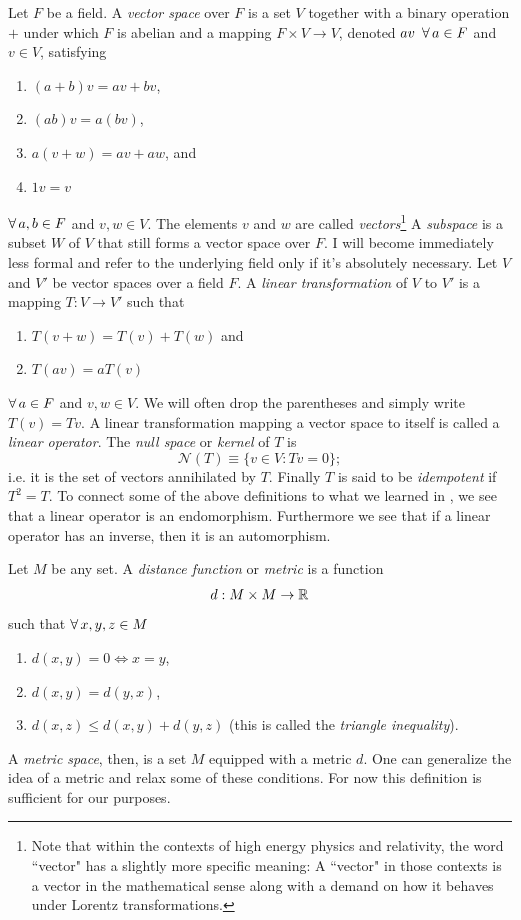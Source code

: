   Let $F$ be a field. A {\it vector space} over $F$ is a set
  $V$ together with a binary operation $+$ under which $F$ is abelian and a
  mapping $F\times V\to V$, denoted $av\ \operatorname{\forall} a\in F$ and $v\in V$,
  satisfying
  \begin{enumerate}
    \item $(a+b)v=av+bv$,
    \item $(ab)v=a(bv)$,
    \item $a(v+w)=av+aw$, and
    \item $1v=v$
  \end{enumerate}
  $\operatorname{\forall} a,b\in F$ and $v,w\in V$. The elements $v$ and $w$ are
  called {\it vectors}\footnote{Note that within the contexts of high
  energy physics and relativity, the word ``vector" has a slightly more
  specific meaning: A ``vector" in those contexts is a vector in the
  mathematical sense along with a demand on how it behaves under
  Lorentz transformations.} A {\it subspace} 
  is a subset $W$ of
  $V$ that still forms a vector space over $F$. I will become immediately
  less formal and refer to the underlying field only if it's absolutely
  necessary.
  Let $V$ and $V'$ be vector spaces over a field $F$. A
  {\it linear transformation} 
  of $V$ to $V'$ is a mapping $T : V\to V'$ such that
  \begin{enumerate}
    \item $T(v+w)=T(v)+T(w)$ and
    \item $T(av)=aT(v)$
  \end{enumerate}
  $\operatorname{\forall} a\in F$ and $v,w\in V$. We will often drop the parentheses
  and simply write $T(v)=Tv$. A linear transformation mapping a
  vector space to itself is called a {\it linear operator}.
  The {\it null space} or {\it kernel} of $T$ is
  \begin{equation}
    \mathcal{N}(T)\equiv\{v\in V:Tv=0\};
  \end{equation}
  i.e. it is the set of vectors annihilated by $T$. Finally $T$ is said
  to be {\it idempotent} if $T^2=T$.
To connect some of the above definitions to what we learned in
, we see that a linear operator is an endomorphism.
Furthermore we see that if a linear operator has an inverse, then it
is an automorphism.

  Let $M$ be any set. A {\it distance function} or {\it metric}
  is a function
  $$d:M\times M\to \mathbb{R}$$
  such that $\operatorname{\forall} x,y,z\in M$
  \begin{enumerate}
    \item $d(x,y)=0\Leftrightarrow x=y$,
    \item $d(x,y)=d(y,x)$,
    \item $d(x,z)\leq d(x,y)+d(y,z)$ (this is called the {\it triangle
          inequality}).
  \end{enumerate}
  A {\it metric space}, then, is a set $M$ equipped with a metric $d$.
One can generalize the idea of a metric and relax some of these
conditions. For now this definition is sufficient for our purposes.


